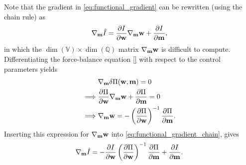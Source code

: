 Note that the gradient in
\eqref{eq:functional_gradient} can be rewritten (using the chain rule)
as
\begin{align}
  \nabla_{\mathbf{m}} \hat{I} =  \frac{\partial  I }{\partial \mathbf{w}} \nabla_{\mathbf{m}} \mathbf{w}
  + \frac{\partial  I }{\partial \mathbf{m}},
  \label{eq:functional_gradient_chain}
\end{align}
in which the $\dim(\mathbb{V}) \times \dim(\mathbb{Q})$ matrix
$\nabla_{\mathbf{m}} \mathbf{w}$ is difficult to compute.
Differentiating the force-balance equation \ref{} with respect to the
control parameters yields
\begin{align}
  & \nabla_{\mathbf{m}} \delta \Pi(\mathbf{w}, \mathbf{m}) = 0 \\
  \implies & \frac{\partial  \Pi }{\partial \mathbf{w}} \nabla_{\mathbf{m}} \mathbf{w}
  + \frac{\partial  \Pi }{\partial \mathbf{m}} = 0 \\
  \implies & \nabla_{\mathbf{m}} \mathbf{w} =
             - \left( \frac{\partial  \Pi }{\partial \mathbf{w}} \right)^{-1} \frac{\partial  \Pi }{\partial \mathbf{m}}.
\end{align}
Inserting this expression for $\nabla_{\mathbf{m}} \mathbf{w}$ into
\eqref{eq:functional_gradient_chain}, gives
\begin{align}
  \nabla_{\mathbf{m}} \hat{I} =  - \frac{\partial  I }{\partial \mathbf{w}}
  \left( \frac{\partial  \Pi }{\partial \mathbf{w}} \right)^{-1} \frac{\partial  \Pi }{\partial \mathbf{m}}
  + \frac{\partial  I }{\partial \mathbf{m}}.
\end{align}






